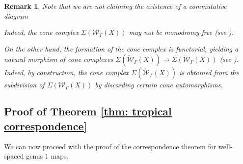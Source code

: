 \documentclass{article}
\newtheorem{remark}[definition]{Remark}
\begin{document}
\begin{remark}
    Note that we are not claiming the existence of a commutative diagram 
    \begin{center}
    \end{center}
    Indeed, the cone complex $\Sigma(\mathcal{W}_{\Gamma}(X))$ may not be monodromy-free (see \cite[Example 3.3.1]{ACMW}).  

    On the other hand, the formation of the cone complex is functorial, yielding a natural morphism of cone complexes $\Sigma(\widetilde{\mathcal{W}}_{\Gamma}(X)) \to \Sigma(\mathcal{W}_\Gamma(X))$ (see \cite[Remark 2.5]{ACGSI}). Indeed, by construction, the cone complex $\Sigma(\widetilde{\mathcal{W}}_{\Gamma}(X))$ is obtained from the subdivision of $\Sigma(\mathcal{W}_{\Gamma}(X))$ by discarding certain cone automorphisms.
\end{remark}

\subsection{Proof of  Theorem \ref{thm: tropical correspondence}}

We can now proceed with the proof of the correspondence theorem for well-spaced genus $1$ maps.
\end{document}
